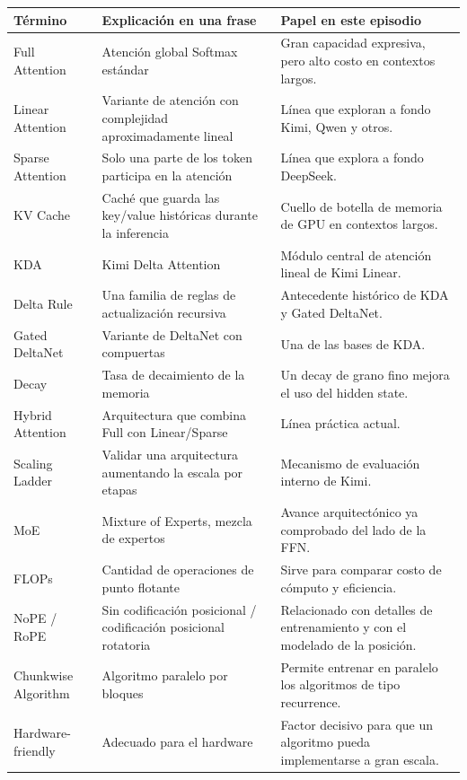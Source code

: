 \documentclass[a4paper]{article}
\begin{document}
\begin{longtable}{p{}p{}p{}}
\toprule
Término & Explicación en una frase & Papel en este episodio \\
\midrule
Full Attention & Atención global Softmax estándar & Gran capacidad expresiva, pero alto costo en contextos largos. \\
Linear Attention & Variante de atención con complejidad aproximadamente lineal & Línea que exploran a fondo Kimi, Qwen y otros. \\
Sparse Attention & Solo una parte de los token participa en la atención & Línea que explora a fondo DeepSeek. \\
KV Cache & Caché que guarda las key/value históricas durante la inferencia & Cuello de botella de memoria de GPU en contextos largos. \\
KDA & Kimi Delta Attention & Módulo central de atención lineal de Kimi Linear. \\
Delta Rule & Una familia de reglas de actualización recursiva & Antecedente histórico de KDA y Gated DeltaNet. \\
Gated DeltaNet & Variante de DeltaNet con compuertas & Una de las bases de KDA. \\
Decay & Tasa de decaimiento de la memoria & Un decay de grano fino mejora el uso del hidden state. \\
Hybrid Attention & Arquitectura que combina Full con Linear/Sparse & Línea práctica actual. \\
Scaling Ladder & Validar una arquitectura aumentando la escala por etapas & Mecanismo de evaluación interno de Kimi. \\
MoE & Mixture of Experts, mezcla de expertos & Avance arquitectónico ya comprobado del lado de la FFN. \\
FLOPs & Cantidad de operaciones de punto flotante & Sirve para comparar costo de cómputo y eficiencia. \\
NoPE / RoPE & Sin codificación posicional / codificación posicional rotatoria & Relacionado con detalles de entrenamiento y con el modelado de la posición. \\
Chunkwise Algorithm & Algoritmo paralelo por bloques & Permite entrenar en paralelo los algoritmos de tipo recurrence. \\
Hardware-friendly & Adecuado para el hardware & Factor decisivo para que un algoritmo pueda implementarse a gran escala. \\
\bottomrule
\end{longtable}
\end{document}
